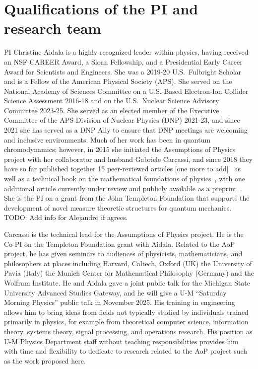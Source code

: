\section{Qualifications of the PI and research team}
PI Christine Aidala is a highly recognized leader within physics, having received an NSF CAREER Award, a Sloan Fellowship, and a Presidential Early Career Award for Scientists and Engineers. She was a 2019-20 U.S.~Fulbright Scholar and is a Fellow of the American Physical Society (APS).  She served on the National Academy of Sciences Committee on a U.S.-Based Electron-Ion Collider Science Assessment 2016-18 and on the U.S.~Nuclear Science Advisory Committee 2023-25.  She served as an elected member of the Executive Committee of the APS Division of Nuclear Physics (DNP) 2021-23, and since 2021 she has served as a DNP Ally to ensure that DNP meetings are welcoming and inclusive environments.  Much of her work has been in quantum chromodynamics; however, in 2015 she initiated the Assumptions of Physics project with her collaborator and husband Gabriele Carcassi, and since 2018 they have so far published together 15 peer-reviewed articles [one more to add]~\cite{aop-phys-blueprint,aop-topExpDisting,aop-HamQuantInfo,Carcassi:2021,aop-spacetimeStruct,aop-HamConsInfoEnt,Carcassi2021four,Carcassi:2022bpm,aop-HamPriv,aop-commonLogical,aop-action,aop-nogo,aop-nonaddmeas,aop-unphysHilbert} as well as a technical book on the mathematical foundations of physics~\cite{aop-book}, with one additional article currently under review and publicly available as a preprint~\cite{aop-classicallimit}.  She is the PI on a grant from the John Templeton Foundation that supports the development of novel measure theoretic structures for quantum mechanics. \\

TODO: Add info for Alejandro if agrees.

Carcassi is the technical lead for the Assumptions of Physics project.  He is the Co-PI on the Templeton Foundation grant with Aidala.  Related to the AoP project, he has given seminars to audiences of physicists, mathematicians, and philosophers at places including Harvard, Caltech, Oxford (UK) the University of Pavia (Italy) the Munich Center for Mathematical Philosophy (Germany) and the Wolfram Institute.  He and Aidala gave a joint public talk for the Michigan State University Advanced Studies Gateway, and he will give a U-M ``Saturday Morning Physics'' public talk in November 2025.  His training in engineering allows him to bring ideas from fields not typically studied by individuals trained primarily in physics, for example from theoretical computer science, information theory, systems theory, signal processing, and operations research.  His position as U-M Physics Department staff without teaching responsibilities provides him with time and flexibility to dedicate to research related to the AoP project such as the work proposed here. \\


